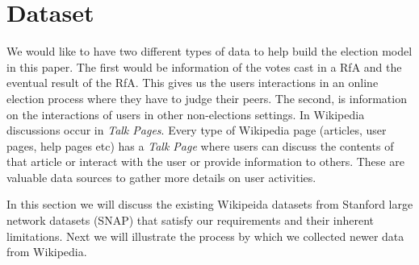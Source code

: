 
\section{Dataset}
\label{sec:dataset}

We would like to have two different types of data to help build the election model in this paper. The first would be information of the votes cast in a RfA and the eventual result of the RfA. This gives us the users interactions in an online election process where they have to judge their peers. The second, is information on the interactions of users in other non-elections settings. In Wikipedia discussions occur in \textit{Talk Pages}. Every type of Wikipedia page (articles, user pages, help pages etc) has a \textit{Talk Page} where users can discuss the contents of that article or interact with the user or provide information to others. These are valuable data sources to gather more details on user activities.
\smallskip

In this section we will discuss the existing Wikipeida datasets from Stanford large network datasets (SNAP) \cite{snapnets} that satisfy our requirements and their inherent limitations. Next we will illustrate the process by which we collected newer data from Wikipedia.

\newcommand{\wikirfa}{{\sc wiki-Rfa}\xspace}
\newcommand{\wikielect}{{\sc wiki-Elect}\xspace}
\newcommand{\wikitalk}{{\sc wiki-Talk}\xspace}


